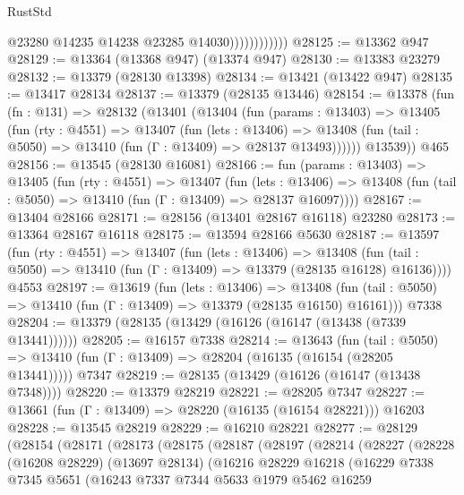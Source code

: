 \begin{lexlean}{RustStd}
\begin{coremodule}
                            @23280
                            @14235
                            @14238
                            @23285
                            @14030))))))))))))
@28125 := @13362 @947
@28129 := @13364 (@13368 @947) (@13374 @947)
@28130 := @13383 @23279
@28132 := @13379 (@28130 @13398)
@28134 := @13421 (@13422 @947)
@28135 := @13417 @28134
@28137 := @13379 (@28135 @13446)
@28154 := @13378
    (fun (fn : @131) =>
    @28132
      (@13401
        (@13404
          (fun (params : @13403) =>
          @13405
            (fun (rty : @4551) =>
            @13407
              (fun (lets : @13406) =>
              @13408 (fun (tail : @5050) => @13410 (fun (Γ : @13409) => @28137 @13493))))))
        @13539))
    @465
@28156 := @13545 (@28130 @16081)
@28166 := fun (params : @13403) =>
  @13405
    (fun (rty : @4551) =>
    @13407
      (fun (lets : @13406) =>
      @13408 (fun (tail : @5050) => @13410 (fun (Γ : @13409) => @28137 @16097))))
@28167 := @13404 @28166
@28171 := @28156 (@13401 @28167 @16118) @23280
@28173 := @13364 @28167 @16118
@28175 := @13594 @28166 @5630
@28187 := @13597
    (fun (rty : @4551) =>
    @13407
      (fun (lets : @13406) =>
      @13408 (fun (tail : @5050) => @13410 (fun (Γ : @13409) => @13379 (@28135 @16128) @16136))))
    @4553
@28197 := @13619
    (fun (lets : @13406) =>
    @13408 (fun (tail : @5050) => @13410 (fun (Γ : @13409) => @13379 (@28135 @16150) @16161)))
    @7338
@28204 := @13379 (@28135 (@13429 (@16126 (@16147 (@13438 (@7339 @13441))))))
@28205 := @16157 @7338
@28214 := @13643
    (fun (tail : @5050) => @13410 (fun (Γ : @13409) => @28204 (@16135 (@16154 (@28205 @13441)))))
    @7347
@28219 := @28135 (@13429 (@16126 (@16147 (@13438 @7348))))
@28220 := @13379 @28219
@28221 := @28205 @7347
@28227 := @13661 (fun (Γ : @13409) => @28220 (@16135 (@16154 @28221))) @16203
@28228 := @13545 @28219
@28229 := @16210 @28221
@28277 := @28129
    (@28154
      (@28171
        (@28173
          (@28175
            (@28187
              (@28197
                (@28214
                  (@28227
                    (@28228
                      (@16208 @28229)
                      (@13697 @28134)
                      (@16216
                        @28229
                        @16218
                        (@16229
                          @7338
                          @7345
                          @5651
                          (@16243
                            @7337
                            @7344
                            @5633
                            @1979
                            @5462
                            @16259

\end{coremodule}
\end{lexlean}

